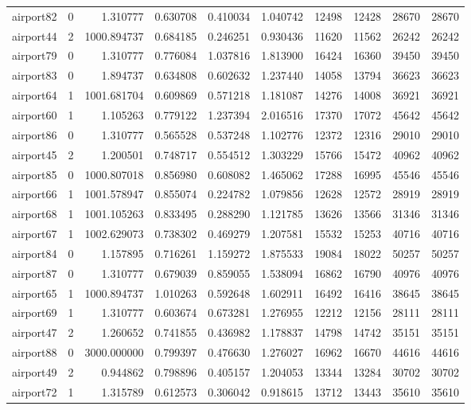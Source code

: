 \begin{longtable}{|l|r|r|r|r|r|r|r|r|r|}
airport82 & 0 & 1.310777 & 0.630708 & 0.410034 & 1.040742 & 12498 & 12428 & 28670 & 28670 \\
airport44 & 2 & 1000.894737 & 0.684185 & 0.246251 & 0.930436 & 11620 & 11562 & 26242 & 26242 \\
airport79 & 0 & 1.310777 & 0.776084 & 1.037816 & 1.813900 & 16424 & 16360 & 39450 & 39450 \\
airport83 & 0 & 1.894737 & 0.634808 & 0.602632 & 1.237440 & 14058 & 13794 & 36623 & 36623 \\
airport64 & 1 & 1001.681704 & 0.609869 & 0.571218 & 1.181087 & 14276 & 14008 & 36921 & 36921 \\
airport60 & 1 & 1.105263 & 0.779122 & 1.237394 & 2.016516 & 17370 & 17072 & 45642 & 45642 \\
airport86 & 0 & 1.310777 & 0.565528 & 0.537248 & 1.102776 & 12372 & 12316 & 29010 & 29010 \\
airport45 & 2 & 1.200501 & 0.748717 & 0.554512 & 1.303229 & 15766 & 15472 & 40962 & 40962 \\
airport85 & 0 & 1000.807018 & 0.856980 & 0.608082 & 1.465062 & 17288 & 16995 & 45546 & 45546 \\
airport66 & 1 & 1001.578947 & 0.855074 & 0.224782 & 1.079856 & 12628 & 12572 & 28919 & 28919 \\
airport68 & 1 & 1001.105263 & 0.833495 & 0.288290 & 1.121785 & 13626 & 13566 & 31346 & 31346 \\
airport67 & 1 & 1002.629073 & 0.738302 & 0.469279 & 1.207581 & 15532 & 15253 & 40716 & 40716 \\
airport84 & 0 & 1.157895 & 0.716261 & 1.159272 & 1.875533 & 19084 & 18022 & 50257 & 50257 \\
airport87 & 0 & 1.310777 & 0.679039 & 0.859055 & 1.538094 & 16862 & 16790 & 40976 & 40976 \\
airport65 & 1 & 1000.894737 & 1.010263 & 0.592648 & 1.602911 & 16492 & 16416 & 38645 & 38645 \\
airport69 & 1 & 1.310777 & 0.603674 & 0.673281 & 1.276955 & 12212 & 12156 & 28111 & 28111 \\
airport47 & 2 & 1.260652 & 0.741855 & 0.436982 & 1.178837 & 14798 & 14742 & 35151 & 35151 \\
airport88 & 0 & 3000.000000 & 0.799397 & 0.476630 & 1.276027 & 16962 & 16670 & 44616 & 44616 \\
airport49 & 2 & 0.944862 & 0.798896 & 0.405157 & 1.204053 & 13344 & 13284 & 30702 & 30702 \\
airport72 & 1 & 1.315789 & 0.612573 & 0.306042 & 0.918615 & 13712 & 13443 & 35610 & 35610 \\

\end{longtable}
